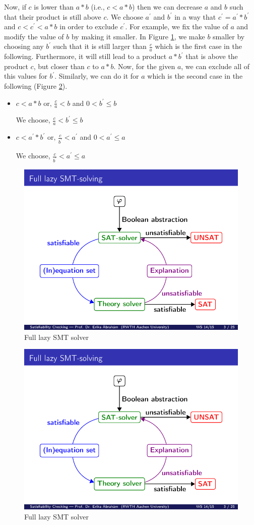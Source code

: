 \noindent Now, if $c$ is lower than $a \ast b$ (i.e., $c < a \ast b$) then we can decrease $a$ and $b$ such that their product is still above $c$.
We choose $a^\prime$ and $b^\prime$ in a way that $c^\prime = a^\prime \ast b^\prime$ and $c < c^\prime < a \ast b$ in order to exclude $c^\prime$.
For example, we fix the value of $a$ and modify the value of $b$ by making it smaller.
In Figure \ref{fig:FixAModifyB}, we make $b$ smaller by choosing any $b^\prime$ such that it is still larger than $\frac{c}{a}$ which is the first case in the following.
Furthermore, it will still lead to a product $a \ast b^\prime$ that is above the product $c$, but closer than $c$ to $a \ast b$.
Now, for the given $a$, we can exclude all of this values for $b^\prime$.
Similarly, we can do it for $a$ which is the second case in the following (Figure \ref{fig:FixBModifyA}).\newline


\begin{itemize}
    \item $c < a \ast b \text{ or, } \frac{c}{a} < b$ and $0 < b^\prime \leq b$\newline
    
    We choose, $\frac{c}{a} < b^\prime \leq b$
     \item $c < a^\prime \ast b^\prime \text{ or, } \frac{c}{b^\prime} < a^\prime$ and $0 < a^\prime \leq a$\newline
     
     We choose, $\frac{c}{b^\prime} < a^\prime \leq a$
\end{itemize}

\begin{figure}[ht!]
  \centering
  \includegraphics[width=0.25\linewidth]{./figures/FullLazySMT.pdf}
  \caption{Full lazy SMT solver \cite{lec:satchecking5a}}
  \label{fig:FixAModifyB}
\end{figure}

\begin{figure}[ht!]
  \centering
  \includegraphics[width=0.25\linewidth]{./figures/FullLazySMT.pdf}
  \caption{Full lazy SMT solver \cite{lec:satchecking5a}}
  \label{fig:FixBModifyA}
\end{figure}

